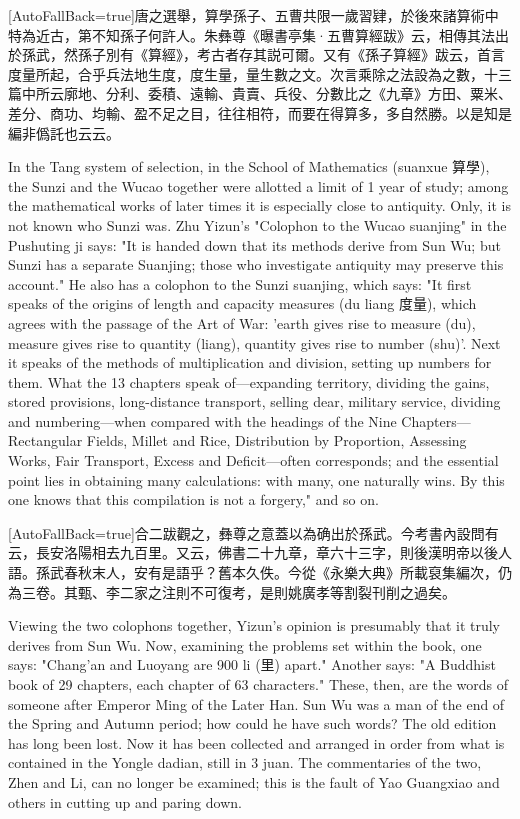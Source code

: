 \documentclass[11pt]{article}
\newcommand{\unitlabel}[1]{\marginpar{\raggedleft\tiny\color{gray}#1}}
\newenvironment{unitzh}{\par\CJKfontspec{Noto Serif CJK SC}[AutoFallBack=true]\large\linespread{1.25}\selectfont}{\par}
\newenvironment{uniten}{\par\small\color{black!85}}{\par\medskip}
\begin{document}
\begin{unitzh}\unitlabel{sunzi-001.4}唐之選舉，算學孫子、五曹共限一歲習肄，於後來諸算術中特為近古，第不知孫子何許人。朱彝尊《曝書亭集·五曹算經跋》云，相傳其法出於孫武，然孫子別有《算經》，考古者存其説可爾。又有《孫子算經》跋云，首言度量所起，合乎兵法地生度，度生量，量生數之文。次言乘除之法設為之數，十三篇中所云廓地、分利、委積、遠輸、貴賣、兵役、分數比之《九章》方田、粟米、差分、商功、均輸、盈不足之目，往往相符，而要在得算多，多自然勝。以是知是編非僞託也云云。\end{unitzh}
\begin{uniten}In the Tang system of selection, in the School of Mathematics (suanxue 算學), the Sunzi and the Wucao together were allotted a limit of 1 year of study; among the mathematical works of later times it is especially close to antiquity. Only, it is not known who Sunzi was. Zhu Yizun's "Colophon to the Wucao suanjing" in the Pushuting ji says: "It is handed down that its methods derive from Sun Wu; but Sunzi has a separate Suanjing; those who investigate antiquity may preserve this account." He also has a colophon to the Sunzi suanjing, which says: "It first speaks of the origins of length and capacity measures (du liang 度量), which agrees with the passage of the Art of War: 'earth gives rise to measure (du), measure gives rise to quantity (liang), quantity gives rise to number (shu)'. Next it speaks of the methods of multiplication and division, setting up numbers for them. What the 13 chapters speak of—expanding territory, dividing the gains, stored provisions, long-distance transport, selling dear, military service, dividing and numbering—when compared with the headings of the Nine Chapters—Rectangular Fields, Millet and Rice, Distribution by Proportion, Assessing Works, Fair Transport, Excess and Deficit—often corresponds; and the essential point lies in obtaining many calculations: with many, one naturally wins. By this one knows that this compilation is not a forgery," and so on.\end{uniten}

\begin{unitzh}\unitlabel{sunzi-001.5}合二跋觀之，彝尊之意蓋以為确出於孫武。今考書內設問有云，長安洛陽相去九百里。又云，佛書二十九章，章六十三字，則後漢明帝以後人語。孫武春秋末人，安有是語乎？舊本久佚。今從《永樂大典》所載裒集編次，仍為三卷。其甄、李二家之注則不可復考，是則姚廣孝等割裂刊削之過矣。\end{unitzh}
\begin{uniten}Viewing the two colophons together, Yizun's opinion is presumably that it truly derives from Sun Wu. Now, examining the problems set within the book, one says: "Chang'an and Luoyang are 900 li (里) apart." Another says: "A Buddhist book of 29 chapters, each chapter of 63 characters." These, then, are the words of someone after Emperor Ming of the Later Han. Sun Wu was a man of the end of the Spring and Autumn period; how could he have such words? The old edition has long been lost. Now it has been collected and arranged in order from what is contained in the Yongle dadian, still in 3 juan. The commentaries of the two, Zhen and Li, can no longer be examined; this is the fault of Yao Guangxiao and others in cutting up and paring down.\end{uniten}
\end{document}
